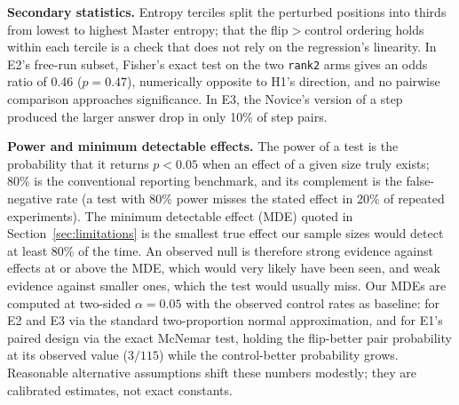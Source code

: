 \documentclass[9pt]{article}
\begin{document}
\textbf{Secondary statistics.} Entropy terciles split the perturbed
positions into thirds from lowest to highest Master entropy; that the
flip$>$control ordering holds within each tercile is a check that does not
rely on the regression's linearity. In E2's free-run subset, Fisher's exact
test on the two \texttt{rank2} arms gives an odds ratio of 0.46
($p = 0.47$), numerically opposite to H1's direction, and no pairwise
comparison approaches significance. In E3, the Novice's version of a step
produced the larger answer drop in only 10\% of step pairs.

\textbf{Power and minimum detectable effects.} The power of a test is the
probability that it returns $p < 0.05$ when an effect of a given size truly
exists; 80\% is the conventional reporting benchmark, and its complement is
the false-negative rate (a test with 80\% power misses the stated effect in
20\% of repeated experiments). The minimum detectable effect (MDE) quoted in
Section~\ref{sec:limitations} is the smallest true effect our sample sizes
would detect at least 80\% of the time. An observed null is therefore strong
evidence against effects at or above the MDE, which would very likely have
been seen, and weak evidence against smaller ones, which the test would
usually miss. Our MDEs are computed at two-sided $\alpha = 0.05$ with the
observed control rates as baseline: for E2 and E3 via the standard
two-proportion normal approximation, and for E1's paired design via the
exact McNemar test, holding the flip-better pair probability at its observed
value ($3/115$) while the control-better probability grows. Reasonable
alternative assumptions shift these numbers modestly; they are calibrated
estimates, not exact constants.
\end{document}
